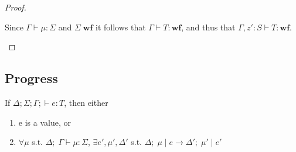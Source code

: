 \documentclass{llncs}
\begin{document}
\begin{proof}
\begin{case}
Since $\Gamma \vdash \mu : \Sigma$ and $\Sigma \; \textbf{wf}$ it
follows that $\Gamma \vdash T : \textbf{wf}$, and thus that 
$\Gamma, z' : S \vdash T : \textbf{wf}$. 

\end{case}
\begin{case}
\end{case}
\begin{case}
\end{case}
\begin{case}
\end{case}
\begin{case}
\end{case}
\end{proof}

\subsection{Progress}
\begin{theorem}[Progress]
If $\Delta; \Sigma; \Gamma;  \vdash e : T$, then either
\begin{enumerate}
\item e is a value, or
\item $\forall \mu$ s.t.
		   $\Delta; \; \Gamma \vdash \mu : \Sigma$,
         $\exists e', \mu', \Delta'$ s.t. 
         $\Delta; \; \mu \; | \; e \rightarrow \Delta'; \; \mu' \; | \; e'$
\end{enumerate}
\end{theorem}
\end{document}
